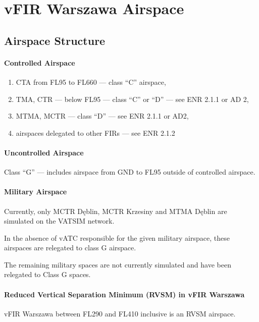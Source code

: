 \chapter{vFIR Warszawa Airspace}%
\label{ch:airspace}
\section{Airspace Structure}%
\label{sect:airspace:structure}

\subsubsection{Controlled Airspace}
\begin{enumerate}[label={\alph*)}]
	\item CTA from FL95 to FL660 --- class ``C'' airspace,
	\item TMA, CTR --- below FL95 --- class ``C'' or ``D'' --- see ENR 2.1.1 or AD 2,
	\item MTMA, MCTR --- class ``D'' --- see ENR 2.1.1 or AD2,
	\item airspaces delegated to other FIRs --- see ENR 2.1.2
\end{enumerate}

\subsubsection{Uncontrolled Airspace}
Class ``G'' --- includes airspace from GND to FL95 outside of controlled airspace.

\subsubsection{Military Airspace}

Currently, only MCTR Dęblin, MCTR Krzesiny and MTMA Dęblin are simulated on the VATSIM network.

In the absence of vATC responsible for the given military airspace, these airspaces are relegated to class G airspace.

The remaining military spaces are not currently simulated and have been relegated to Class G spaces.

\subsubsection{Reduced Vertical Separation Minimum (RVSM) in vFIR Warszawa}
\label{sssec:airspace:rvsm}
vFIR Warszawa between FL290 and FL410 inclusive is an RVSM airspace.

